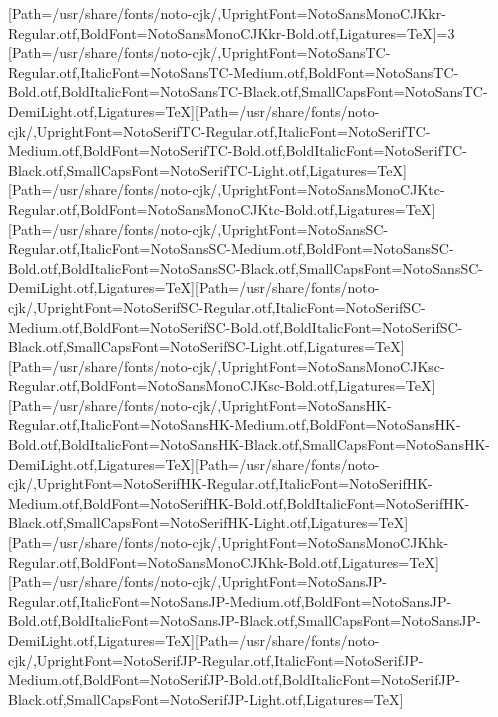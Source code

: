 \newfontfamily{}[Path=/usr/share/fonts/noto-cjk/,UprightFont=NotoSansMonoCJKkr-Regular.otf,BoldFont=NotoSansMonoCJKkr-Bold.otf,Ligatures=TeX]\else\ifnum\value{NotoCJKFamily}=3
\newfontfamily{}[Path=/usr/share/fonts/noto-cjk/,UprightFont=NotoSansTC-Regular.otf,ItalicFont=NotoSansTC-Medium.otf,BoldFont=NotoSansTC-Bold.otf,BoldItalicFont=NotoSansTC-Black.otf,SmallCapsFont=NotoSansTC-DemiLight.otf,Ligatures=TeX]\newfontfamily{}[Path=/usr/share/fonts/noto-cjk/,UprightFont=NotoSerifTC-Regular.otf,ItalicFont=NotoSerifTC-Medium.otf,BoldFont=NotoSerifTC-Bold.otf,BoldItalicFont=NotoSerifTC-Black.otf,SmallCapsFont=NotoSerifTC-Light.otf,Ligatures=TeX]
\newfontfamily{}[Path=/usr/share/fonts/noto-cjk/,UprightFont=NotoSansMonoCJKtc-Regular.otf,BoldFont=NotoSansMonoCJKtc-Bold.otf,Ligatures=TeX]
\newfontfamily{}[Path=/usr/share/fonts/noto-cjk/,UprightFont=NotoSansSC-Regular.otf,ItalicFont=NotoSansSC-Medium.otf,BoldFont=NotoSansSC-Bold.otf,BoldItalicFont=NotoSansSC-Black.otf,SmallCapsFont=NotoSansSC-DemiLight.otf,Ligatures=TeX]\newfontfamily{}[Path=/usr/share/fonts/noto-cjk/,UprightFont=NotoSerifSC-Regular.otf,ItalicFont=NotoSerifSC-Medium.otf,BoldFont=NotoSerifSC-Bold.otf,BoldItalicFont=NotoSerifSC-Black.otf,SmallCapsFont=NotoSerifSC-Light.otf,Ligatures=TeX]
\newfontfamily{}[Path=/usr/share/fonts/noto-cjk/,UprightFont=NotoSansMonoCJKsc-Regular.otf,BoldFont=NotoSansMonoCJKsc-Bold.otf,Ligatures=TeX]
\newfontfamily{}[Path=/usr/share/fonts/noto-cjk/,UprightFont=NotoSansHK-Regular.otf,ItalicFont=NotoSansHK-Medium.otf,BoldFont=NotoSansHK-Bold.otf,BoldItalicFont=NotoSansHK-Black.otf,SmallCapsFont=NotoSansHK-DemiLight.otf,Ligatures=TeX]\newfontfamily{}[Path=/usr/share/fonts/noto-cjk/,UprightFont=NotoSerifHK-Regular.otf,ItalicFont=NotoSerifHK-Medium.otf,BoldFont=NotoSerifHK-Bold.otf,BoldItalicFont=NotoSerifHK-Black.otf,SmallCapsFont=NotoSerifHK-Light.otf,Ligatures=TeX]
\newfontfamily{}[Path=/usr/share/fonts/noto-cjk/,UprightFont=NotoSansMonoCJKhk-Regular.otf,BoldFont=NotoSansMonoCJKhk-Bold.otf,Ligatures=TeX]
\newfontfamily{}[Path=/usr/share/fonts/noto-cjk/,UprightFont=NotoSansJP-Regular.otf,ItalicFont=NotoSansJP-Medium.otf,BoldFont=NotoSansJP-Bold.otf,BoldItalicFont=NotoSansJP-Black.otf,SmallCapsFont=NotoSansJP-DemiLight.otf,Ligatures=TeX]\newfontfamily{}[Path=/usr/share/fonts/noto-cjk/,UprightFont=NotoSerifJP-Regular.otf,ItalicFont=NotoSerifJP-Medium.otf,BoldFont=NotoSerifJP-Bold.otf,BoldItalicFont=NotoSerifJP-Black.otf,SmallCapsFont=NotoSerifJP-Light.otf,Ligatures=TeX]
